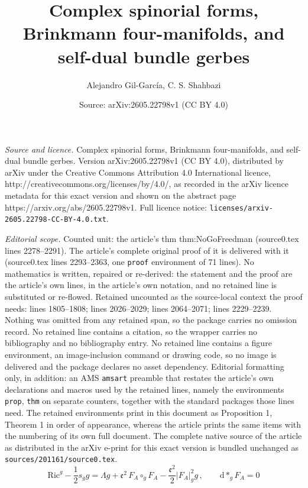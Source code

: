 \documentclass[10pt,a4paper]{amsart}
\title{Complex spinorial forms, Brinkmann four-manifolds, and self-dual bundle gerbes}
\author{Alejandro Gil-Garc\'ia, C. S. Shahbazi}
\date{Source: arXiv:2605.22798v1 (CC BY 4.0)}
\def\dd{\mathrm{d}}
\begin{document}
\maketitle

\noindent\emph{Source and licence.} Complex spinorial forms, Brinkmann four-manifolds, and self-dual bundle gerbes. Version arXiv:2605.22798v1 (CC BY 4.0), distributed by arXiv under the Creative Commons Attribution 4.0 International licence, http://creativecommons.org/licenses/by/4.0/, as recorded in the arXiv licence metadata for this exact version and shown on the abstract page https://arxiv.org/abs/2605.22798v1. Full licence notice: \texttt{licenses/arxiv-2605.22798-CC-BY-4.0.txt}.\par\smallskip

\noindent\textit{Editorial scope.} Counted unit: the article's thm thm:NoGoFreedman (source0.tex lines 2278--2291). The article's complete original proof of it is delivered with it (source0.tex lines 2293--2363, one \texttt{proof} environment of 71 lines). No mathematics is written, repaired or re-derived: the statement and the proof are the article's own lines, in the article's own notation, and no retained line is substituted or re-flowed.  Retained uncounted as the source-local context the proof needs: lines 1805--1808; lines 2026--2029; lines 2064--2071; lines 2229--2239.  Nothing was omitted from any retained span, so the package carries no omission record.  No retained line contains a citation, so the wrapper carries no bibliography and no bibliography entry.  No retained line contains a figure environment, an image-inclusion command or drawing code, so no image is delivered and the package declares no asset dependency.  Editorial formatting only, in addition: an AMS \texttt{amsart} preamble that restates the article's own declarations and macros used by the retained lines, namely the environments \texttt{prop}, \texttt{thm} on separate counters, together with the standard packages those lines need.  The retained environments print in this document as Proposition 1, Theorem 1 in order of appearance, whereas the article prints the same items with the numbering of its own full document.  The complete native source of the article as distributed in the arXiv e-print for this exact version is bundled unchanged as \texttt{sources/201161/source0.tex}.
\begin{equation}
\label{eq:Freedmaneqs}
\mathrm{Ric}^g - \frac{1}{2} s_g g  = \Lambda g + \mathfrak{e}^2\, F_A \circ_g F_A - \frac{\mathfrak{e}^2}{2}  \vert F_A \vert^2_g g\, , \qquad \dd \ast_g F_A =0 
\end{equation}
\end{document}
